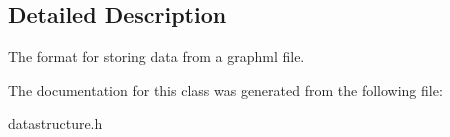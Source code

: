 \subsection{\-Detailed \-Description}
\-The format for storing data from a graphml file. 

\-The documentation for this class was generated from the following file\-:\begin{DoxyCompactItemize}
\item 
datastructure.\-h\end{DoxyCompactItemize}
